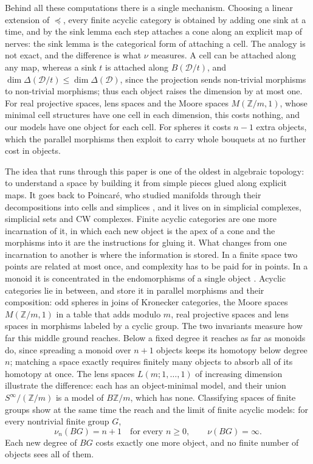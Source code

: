 \documentclass[12pt]{amsart}
\theoremstyle{definition}
\theoremstyle{remark}
\newcommand{\DD}{\mathcal{D}}
\newcommand{\Z}{\mathbb{Z}}
\newcommand{\M}{M}
\newcommand{\nerve}{\Delta}
\begin{document}
Behind all these computations there is a single mechanism. Choosing a linear extension of $\preceq$, every finite acyclic category is obtained by adding one sink at a time, and by the sink lemma each step attaches a cone along an explicit map of nerves: the sink lemma is the categorical form of attaching a cell. The analogy is not exact, and the difference is what $\nu$ measures. A cell can be attached along any map, whereas a sink $t$ is attached along $B(\DD/t)$, and $\dim\nerve(\DD/t)\le\dim\nerve(\DD)$, since the projection sends non-trivial morphisms to non-trivial morphisms; thus each object raises the dimension by at most one. For real projective spaces, lens spaces and the Moore spaces $\M(\Z/m,1)$, whose minimal cell structures have one cell in each dimension, this costs nothing, and our models have one object for each cell. For spheres it costs $n-1$ extra objects, which the parallel morphisms then exploit to carry whole bouquets at no further cost in objects.

The idea that runs through this paper is one of the oldest in algebraic topology: to understand a space by building it from simple pieces glued along explicit maps. It goes back to Poincar\'e, who studied manifolds through their decompositions into cells and simplices \cite{Poincare1895,Poincare1899}, and it lives on in simplicial complexes, simplicial sets and CW complexes. Finite acyclic categories are one more incarnation of it, in which each new object is the apex of a cone and the morphisms into it are the instructions for gluing it. What changes from one incarnation to another is where the information is stored. In a finite space two points are related at most once, and complexity has to be paid for in points. In a monoid it is concentrated in the endomorphisms of a single object \cite{McDuff1979,BenBassat2026}. Acyclic categories lie in between, and store it in parallel morphisms and their composition: odd spheres in joins of Kronecker categories, the Moore spaces $\M(\Z/m,1)$ in a table that adds modulo $m$, real projective spaces and lens spaces in morphisms labeled by a cyclic group. The two invariants measure how far this middle ground reaches. Below a fixed degree it reaches as far as monoids do, since spreading a monoid over $n+1$ objects keeps its homotopy below degree $n$; matching a space exactly requires finitely many objects to absorb all of its homotopy at once. The lens spaces $L(m;1,\dots,1)$ of increasing dimension illustrate the difference: each has an object-minimal model, and their union $S^\infty/(\Z/m)$ is a model of $B\Z/m$, which has none. Classifying spaces of finite groups show at the same time the reach and the limit of finite acyclic models: for every nontrivial finite group $G$,
\[
\nu_n(BG)=n+1\quad\text{for every }n\ge0,\qquad\nu(BG)=\infty.
\]
Each new degree of $BG$ costs exactly one more object, and no finite number of objects sees all of them.



\end{document}
